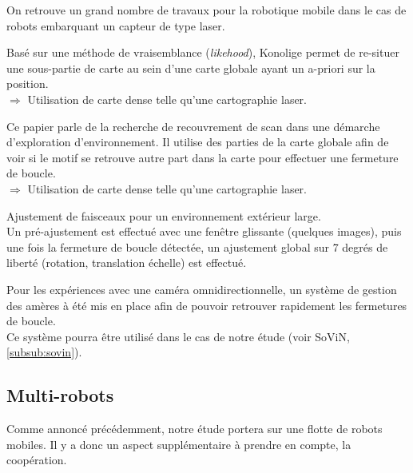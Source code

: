 On retrouve un grand nombre de travaux pour la robotique mobile dans le cas de robots embarquant un capteur de type laser.

Basé sur une méthode de vraisemblance (\textit{likehood}), Konolige permet de re-situer une sous-partie de carte au sein d'une carte globale ayant un a-priori sur la position.\\
$\Rightarrow$ Utilisation de carte dense telle qu'une cartographie laser.




Ce papier parle de la recherche de recouvrement de scan dans une démarche d'exploration d'environnement. 
Il utilise des parties de la carte globale afin de voir si le motif se retrouve autre part dans la carte pour effectuer une fermeture de boucle.\\
$\Rightarrow$ Utilisation de carte dense telle qu'une cartographie laser.



Ajustement de faisceaux pour un environnement extérieur large.\\
Un pré-ajustement est effectué avec une fenêtre glissante (quelques images), puis une fois la fermeture de boucle détectée, un ajustement global sur 7 degrés de liberté (rotation, translation échelle) est effectué. 



Pour les expériences avec une caméra omnidirectionnelle, un système de gestion des amères à été mis en place afin de pouvoir retrouver rapidement les fermetures de boucle.\\
Ce système pourra être utilisé dans le cas de notre étude (voir SoViN, \ref{subsub:sovin}).



\subsection{Multi-robots}

Comme annoncé précédemment, notre étude portera sur une flotte de robots mobiles.
Il y a donc un aspect supplémentaire à prendre en compte, la coopération.


